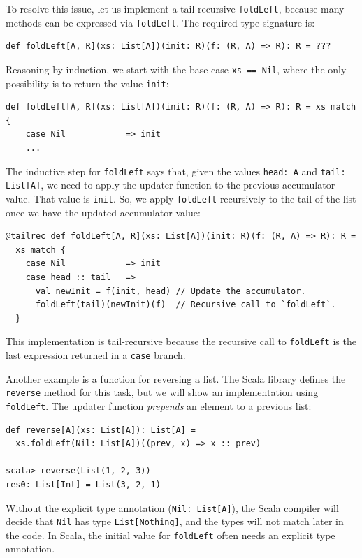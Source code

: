 To resolve this issue, let us implement a tail-recursive \lstinline!foldLeft!,
because many methods can be expressed via \lstinline!foldLeft!. The
required type signature is:
\begin{lstlisting}
def foldLeft[A, R](xs: List[A])(init: R)(f: (R, A) => R): R = ???
\end{lstlisting}
Reasoning by induction, we start with the base case \lstinline!xs == Nil!,
where the only possibility is to return the value \lstinline!init!:
\begin{lstlisting}
def foldLeft[A, R](xs: List[A])(init: R)(f: (R, A) => R): R = xs match {
    case Nil            => init
    ...
\end{lstlisting}
The inductive step for \lstinline!foldLeft! says that, given the
values \lstinline!head: A! and \lstinline!tail: List[A]!, we need
to apply the updater function to the previous accumulator value. That
value is \lstinline!init!. So, we apply \lstinline!foldLeft! recursively
to the tail of the list once we have the updated accumulator value:
\begin{lstlisting}
@tailrec def foldLeft[A, R](xs: List[A])(init: R)(f: (R, A) => R): R =
  xs match {
    case Nil            => init
    case head :: tail   => 
      val newInit = f(init, head) // Update the accumulator.
      foldLeft(tail)(newInit)(f)  // Recursive call to `foldLeft`.
  }
\end{lstlisting}
This implementation is tail-recursive because the recursive call to
\lstinline!foldLeft! is the last expression returned in a \lstinline!case!
branch.

Another example is a function for reversing a list. The Scala library
defines the \lstinline!reverse! method for this task, but we will
show an implementation using \lstinline!foldLeft!. The updater function
\emph{prepends} an element to a previous list:
\begin{lstlisting}
def reverse[A](xs: List[A]): List[A] =
  xs.foldLeft(Nil: List[A])((prev, x) => x :: prev)

scala> reverse(List(1, 2, 3))
res0: List[Int] = List(3, 2, 1) 
\end{lstlisting}
Without the explicit type annotation (\lstinline!Nil: List[A]!),
the Scala compiler will decide that \lstinline!Nil! has type \lstinline!List[Nothing]!,
and the types will not match later in the code. In Scala, the initial
value for \lstinline!foldLeft! often needs an explicit type annotation.

